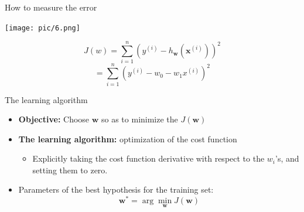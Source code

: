 \documentclass[serif, aspectratio=169]{beamer}
\begin{document}
\begin{frame}{How to measure the error}

    \begin{minipage}{0.5\textwidth}
        \centering
        \texttt{[image: pic/6.png]}
    \end{minipage}%
    \begin{minipage}{0.5\textwidth}
    
        \[
        J(w) = \sum_{i=1}^{n} \left( y^{(i)} - h_{\mathbf{w}}(\mathbf{x}^{(i)}) \right)^2
        \]
        \[
        = \sum_{i=1}^{n} \left( y^{(i)} - w_0 - w_1 x^{(i)} \right)^2
        \]
    \end{minipage}
    \vfill
\end{frame}


\begin{frame}{The learning algorithm}

    \begin{itemize}
        \item \textbf{Objective:} Choose \( \mathbf{w} \) so as to minimize the \( J(\mathbf{w}) \)
    
        \item \textbf{The learning algorithm:} optimization of the cost function
        \begin{itemize}
            \item Explicitly taking the cost function derivative with respect to the \( w_i \)'s, and setting them to zero.
        \end{itemize}
        
        \item Parameters of the best hypothesis for the training set:
        \[
        \mathbf{w}^* = \arg \min_{\mathbf{w}} J(\mathbf{w})
        \]
    \end{itemize}
    
    
\end{frame}
\end{document}
